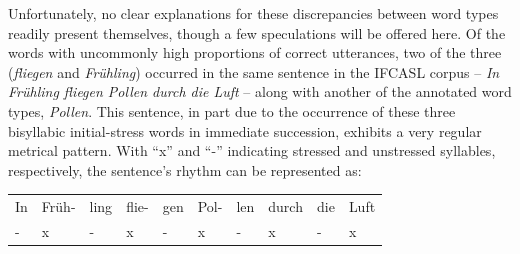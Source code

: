 			Unfortunately, no clear explanations for these discrepancies between word types readily present themselves, though a few speculations will be offered here. Of the words with uncommonly high proportions of correct utterances, two of the three (\textit{fliegen} and \textit{Fr\"{u}hling}) occurred in the same sentence in the IFCASL corpus --  \textit{In Fr\"uhling fliegen Pollen durch die Luft} -- along with another of the annotated word types, \textit{Pollen}. This sentence, in part due to the occurrence of these three bisyllabic initial-stress words in immediate succession, exhibits a very regular metrical pattern. With ``x'' and ``-'' indicating stressed and unstressed syllables, respectively, the sentence's rhythm can be represented as:
			\begin{center}
			\begin{tabular}{llllllllll}
			In & Fr\"uh-& ling & flie-& gen & Pol-& len & durch & die & Luft \\
			- & x & - &  x & - & x & - & x & - & x \\
			\end{tabular}
			\end{center}
